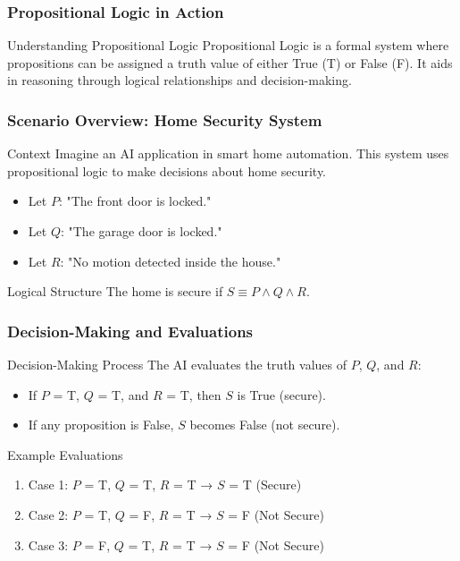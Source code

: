 \documentclass[aspectratio=169]{beamer}
\begin{document}
\begin{frame}[fragile]
    \frametitle{Propositional Logic in Action}
    \begin{block}{Understanding Propositional Logic}
        Propositional Logic is a formal system where propositions can be assigned a truth value of either True (T) or False (F). It aids in reasoning through logical relationships and decision-making.
    \end{block}
\end{frame}

\begin{frame}[fragile]
    \frametitle{Scenario Overview: Home Security System}
    \begin{block}{Context}
        Imagine an AI application in smart home automation. This system uses propositional logic to make decisions about home security.
    \end{block}

    \begin{itemize}
        \item Let \( P \): "The front door is locked."
        \item Let \( Q \): "The garage door is locked."
        \item Let \( R \): "No motion detected inside the house."
    \end{itemize}

    \begin{block}{Logical Structure}
        The home is secure if \( S \equiv P \land Q \land R \).
    \end{block}
\end{frame}

\begin{frame}[fragile]
    \frametitle{Decision-Making and Evaluations}
    \begin{block}{Decision-Making Process}
        The AI evaluates the truth values of \( P \), \( Q \), and \( R \):
        \begin{itemize}
            \item If \( P \) = T, \( Q \) = T, and \( R \) = T, then \( S \) is True (secure).
            \item If any proposition is False, \( S \) becomes False (not secure).
        \end{itemize}
    \end{block}

    \begin{block}{Example Evaluations}
        \begin{enumerate}
            \item Case 1: \( P \) = T, \( Q \) = T, \( R \) = T → \( S \) = T (Secure)
            \item Case 2: \( P \) = T, \( Q \) = F, \( R \) = T → \( S \) = F (Not Secure)
            \item Case 3: \( P \) = F, \( Q \) = T, \( R \) = T → \( S \) = F (Not Secure)
        \end{enumerate}
    \end{block}
\end{frame}
\end{document}
